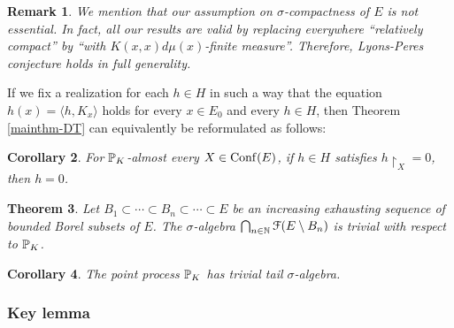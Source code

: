 \documentclass[12pt]{paper}
\newtheorem{theorem}{Theorem}
\newtheorem{corollary}[theorem]{Corollary}
\newtheorem{remark}[theorem]{Remark}
\numberwithin{theorem}{section}
\numberwithin{figure}{section}
\numberwithin{equation}{section}
\begin{document}
\begin{remark}
We mention that our assumption on $\sigma$-compactness of $E$ is not essential. In fact, all our results are valid by replacing everywhere ``relatively compact'' by ``with $K(x, x)d\mu(x)$-finite measure''. Therefore, Lyons-Peres conjecture holds in full generality.
\end{remark}

If we fix a realization for each $h\in H$ in such a way that  the equation
$h(x) = \langle h, K_x\rangle$ holds  for every $x\in E_0$ and every $h\in H$, then Theorem \ref{mainthm-DT} can equivalently be reformulated as follows:
\begin{corollary}\label{zeroset}
For $\mathbb{P}_K$-almost every $X \in \mathrm{Conf}(E)$,  if $h\in H$ satisfies $h\restriction_{X} =0$, then $h =0$.
\end{corollary}











\begin{theorem}\label{main-thm3}
Let $B_1 \subset \cdots \subset B_n \subset \cdots \subset E$ be an increasing exhausting sequence of bounded Borel subsets of $E$. The $\sigma$-algebra
$
\bigcap_{n\in\mathbb{N}}\mathcal{F}(E\setminus B_n)
$
is trivial with respect to $\mathbb{P}_K$.
\end{theorem}

\begin{corollary}\label{cor-Lyons-conj}
The point process $\mathbb{P}_K$  has trivial tail $\sigma$-algebra.
\end{corollary}

\subsubsection{Key lemma}
\end{document}
